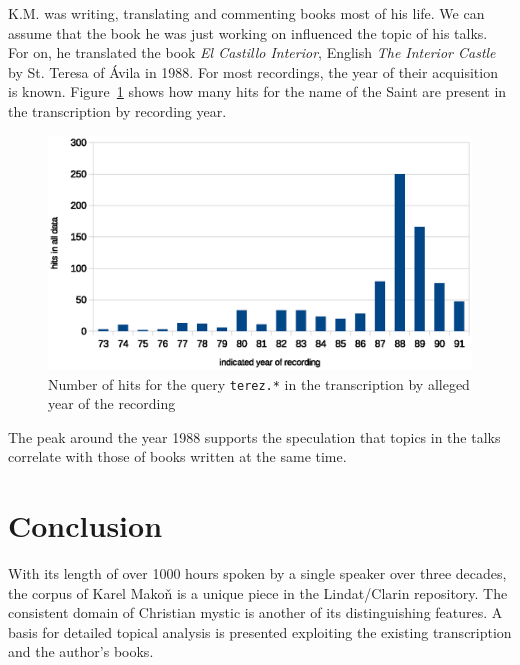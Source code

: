 \documentclass[a4paper,11pt]{article}
\begin{document}
K.M. was writing, translating and commenting books most of his life. We can
assume that the book he was just working on influenced the topic of his talks. 
For on, he translated the book \emph{El Castillo Interior}, English \emph{The
Interior Castle} by St. Teresa of Ávila in 1988. For most recordings, the year
of their acquisition is known.  Figure~\ref{fig:teresa-year} shows how many hits
for the name of the Saint are present in the transcription by recording year.

\begin{figure}[htpb]
\includegraphics[scale=0.6]{rc/teresa-by-year.eps}
\caption{Number of hits for the query \texttt{terez.*} in the transcription by
alleged year of the recording}
\label{fig:teresa-year}
\end{figure}

The peak around the year 1988 supports the speculation that topics in the talks
correlate with those of books written at the same time.

\section{Conclusion}

With its length of over 1000 hours spoken by a single speaker over three
decades, the corpus of Karel Mako\v{n} is a unique piece in the Lindat/Clarin
repository. The consistent domain of Christian mystic is another of its
distinguishing features. A basis for detailed topical analysis is presented
exploiting the existing transcription and the author's books.

\end{document}

